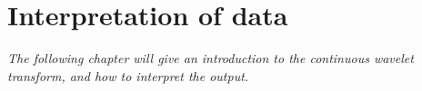 \chapter{Interpretation of data}
\textit{The following chapter will give an introduction to the continuous wavelet transform, and how to interpret the output.}